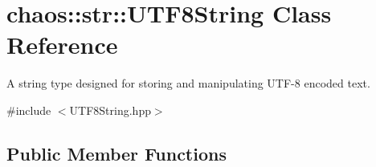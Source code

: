 \hypertarget{classchaos_1_1str_1_1_u_t_f8_string}{\section{chaos\-:\-:str\-:\-:U\-T\-F8\-String Class Reference}
\label{classchaos_1_1str_1_1_u_t_f8_string}
}


A string type designed for storing and manipulating U\-T\-F-\/8 encoded text.  




{\ttfamily \#include $<$U\-T\-F8\-String.\-hpp$>$}

\subsection*{Public Member Functions}
